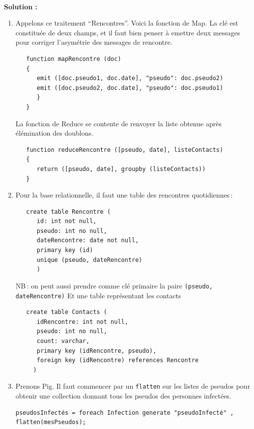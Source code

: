 \documentclass[11pt,a4paper]{article}
\newenvironment{solution}[0]{
~\\ \color{red} \textbf{Solution : }\color{black}}{%
}
\begin{document}
\begin{solution}
\begin{enumerate}
\item Appelons ce traitement ``Rencontres''. Voici la fonction de Map. La clé
est constituée de deux champs, et il faut bien penser à emettre deux messages
pour corriger l'asymétrie des messages de rencontre.
\begin{small}
\begin{verbatim}
   function mapRencontre (doc)
   {
      emit ([doc.pseudo1, doc.date], "pseudo": doc.pseudo2)
      emit ([doc.pseudo2, doc.date], "pseudo": doc.pseudo1)
      }
   }
\end{verbatim}
\end{small}

  La fonction de Reduce se contente de renvoyer la
  liste obtenue après élémination des doublons.
  \begin{small}
\begin{verbatim}
   function reduceRencontre ([pseudo, date], listeContacts)
   {
      return ([pseudo, date], groupby (listeContacts))
   }
\end{verbatim}
\end{small}
  
  \item Pour la base relationnelle, il faut une table des rencontres quotidiennes\,:
\begin{small}
\begin{verbatim}
   create table Rencontre (
      id: int not null,
      pseudo: int no null,
      dateRencontre: date not null,
      primary key (id)
      unique (pseudo, dateRencontre)
      )
\end{verbatim}
\end{small}
NB\,: on peut aussi prendre comme clé primaire la paire \texttt{(pseudo, dateRencontre)}
Et une table représentant les contacts 
\begin{small}
\begin{verbatim}
   create table Contacts (
      idRencontre: int not null,
      pseudo: int no null,
      count: varchar,
      primary key (idRencontre, pseudo),
      foreign key (idRencontre) references Rencontre
     )
\end{verbatim}
\end{small}

  
  \item Prenons Pig. Il faut commencer par un \texttt{flatten} sur les listes
  de pseudos pour obtenir une collection donnant tous les pseudos des personnes
  infectées.
\begin{small}
\begin{verbatim}
pseudosInfectés = foreach Infection generate "pseudoInfecté" , flatten(mesPseudos);
\end{verbatim}
\end{small}


\end{enumerate}
\end{solution}
\end{document}
